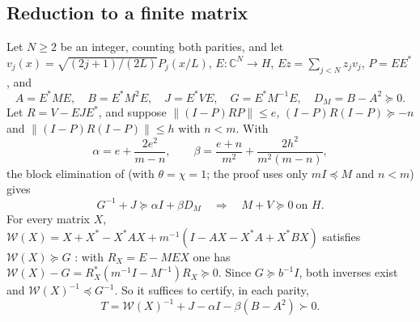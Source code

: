 \documentclass[11pt]{amsart}
\theoremstyle{remark}
\numberwithin{equation}{section}
\newcommand{\C}{\mathbb{C}}
\begin{document}
\subsection{Reduction to a finite matrix}
Let $N\ge2$ be an integer, counting both parities, and let $v_j(x)=\sqrt{(2j+1)/(2L)}P_j(x/L)$, $E:\C^N\to H$, $Ez=\sum_{j<N}z_jv_j$, $P=EE^*$, and
\[
A=E^*ME,\quad B=E^*M^2E,\quad J=E^*VE,\quad G=E^*M^{-1}E,\quad D_M=B-A^2\succeq0 .
\]
Let $R=V-EJE^*$, and suppose $\|(I-P)RP\|\le e$, $(I-P)R(I-P)\succeq-n$ and $\|(I-P)R(I-P)\|\le h$ with $n<m$. With
\[
\alpha=e+\frac{2e^2}{m-n},\qquad\beta=\frac{e+n}{m^2}+\frac{2h^2}{m^2(m-n)},
\]
the block elimination of \cite[(4.1)]{MoriVI} (with $\theta=\chi=1$; the proof uses only $mI\preceq M$ and $n<m$) gives
\begin{equation}\label{eq:finite}
G^{-1}+J\succeq\alpha I+\beta D_M\quad\Longrightarrow\quad M+V\succeq0\ \text{on }H .
\end{equation}
For every matrix $X$, $\mathcal W(X)=X+X^*-X^*AX+m^{-1}(I-AX-X^*A+X^*BX)$ satisfies $\mathcal W(X)\succeq G$ \cite[Section~4]{MoriVI}: with $R_X=E-MEX$ one has $\mathcal W(X)-G=R_X^*(m^{-1}I-M^{-1})R_X\succeq0$. Since $G\succeq b^{-1}I$, both inverses exist and $\mathcal W(X)^{-1}\preceq G^{-1}$. So it suffices to certify, in each parity,
\begin{equation}\label{eq:T}
T=\mathcal W(X)^{-1}+J-\alpha I-\beta(B-A^2)\succ0 .
\end{equation}
\end{document}
